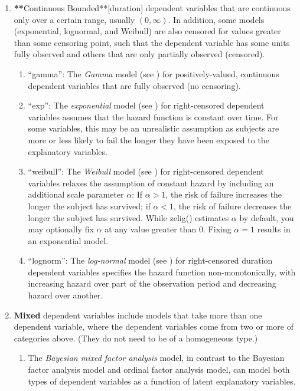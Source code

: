 \documentclass[letterpaper,10pt,english]{sphinxmanual}
\begin{document}
\begin{enumerate}
\item {} 
{\color{red}\bfseries{}**}Continuous Bounded**{[}duration{]} dependent variables that are
continuous only over a certain range, usually \((0, \infty)\). In
addition, some models (exponential, lognormal, and Weibull) are also
censored for values greater than some censoring point, such that the
dependent variable has some units fully observed and others that are
only partially observed (censored).
\begin{enumerate}
\item {} 
“gamma”: The \emph{Gamma} model (see ) for positively-valued,
continuous dependent variables that are fully observed (no
censoring).

\item {} 
“exp”: The \emph{exponential} model (see ) for right-censored dependent
variables assumes that the hazard function is constant over time.
For some variables, this may be an unrealistic assumption as
subjects are more or less likely to fail the longer they have been
exposed to the explanatory variables.

\item {} 
“weibull”: The \emph{Weibull} model (see ) for right-censored dependent
variables relaxes the assumption of constant hazard by including
an additional scale parameter \(\alpha\): If
\(\alpha > 1\), the risk of failure increases the longer the
subject has survived; if \(\alpha < 1\), the risk of failure
decreases the longer the subject has survived. While zelig()
estimates \(\alpha\) by default, you may optionally fix
\(\alpha\) at any value greater than 0. Fixing
\(\alpha = 1\) results in an exponential model.

\item {} 
“lognorm”: The \emph{log-normal} model (see ) for right-censored
duration dependent variables specifies the hazard function
non-monotonically, with increasing hazard over part of the
observation period and decreasing hazard over another.

\end{enumerate}

\item {} 
\textbf{Mixed} dependent variables include models that take more than one
dependent variable, where the dependent variables come from two or
more of categories above. (They do not need to be of a homogeneous
type.)
\begin{enumerate}
\item {} 
The \emph{Bayesian mixed factor analysis} model, in contrast to the
Bayesian factor analysis model and ordinal factor analysis model,
can model both types of dependent variables as a function of
latent explanatory variables.


\end{enumerate}
\end{enumerate}
\end{document}
